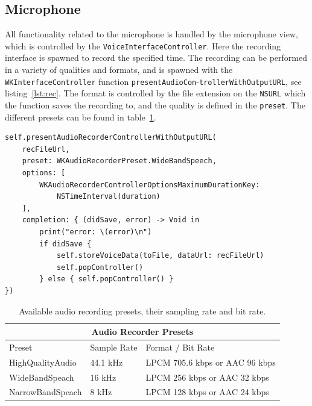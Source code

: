 \subsection{Microphone}
All functionality related to the microphone is handled by the microphone view,
which is controlled by the \texttt{VoiceInterfaceController}.
Here the recording interface is spawned to record the specified time. The
recording can be performed in a variety of qualities and formats, and is spawned
with the \texttt{WKInterfaceController} function
\texttt{presentAudioCon}-\texttt{trollerWithOutputURL}, see listing~\ref{lst:rec}. The format is
controlled by the file extension on the \texttt{NSURL} which the function saves
the recording to, and the quality is defined in the \texttt{preset}. The
different presets can be found in table~\ref{tbl:rec}.

\begin{lstlisting}[label={lst:rec}, caption={Spawning of the audio recording
    controller.},basicstyle=\small]
self.presentAudioRecorderControllerWithOutputURL(
    recFileUrl,
    preset: WKAudioRecorderPreset.WideBandSpeech,
    options: [
        WKAudioRecorderControllerOptionsMaximumDurationKey: 
            NSTimeInterval(duration)
    ],
    completion: { (didSave, error) -> Void in
        print("error: \(error)\n")
        if didSave {
            self.storeVoiceData(toFile, dataUrl: recFileUrl)
            self.popController()
        } else { self.popController() }
})
\end{lstlisting}

\begin{table}[h]
\caption{Available audio recording presets, their sampling rate and bit rate.}
\label{tbl:rec}
\centering
\begin{tabular}{ |l|l|l|  }
\hline
\multicolumn{3}{|c|}{Audio Recorder Presets} \\
\hline
Preset             & Sample Rate & Format / Bit Rate\\
\hline
HighQualityAudio   & 44.1 kHz    & LPCM 705.6 kbps or AAC 96 kbps \\
WideBandSpeach     & 16 kHz      & LPCM 256 kbps or AAC 32 kbps \\
NarrowBandSpeach   & 8 kHz       & LPCM 128 kbps or AAC 24 kbps \\
\hline
\end{tabular}
\end{table}

